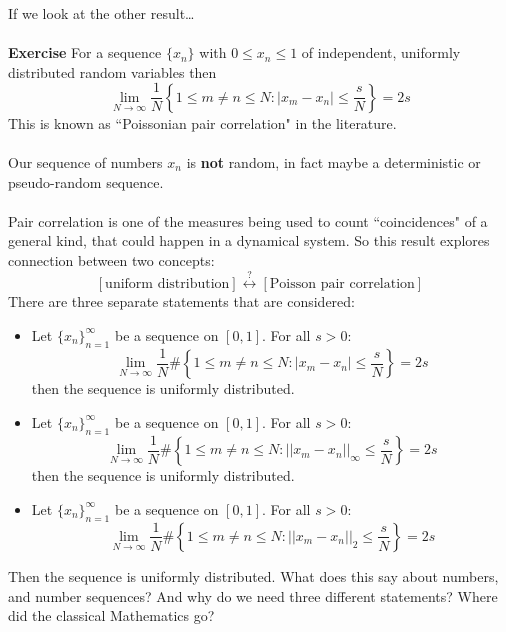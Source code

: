 \documentclass[12pt]{article}
\begin{document}
\newpage 

\noindent If we look at the other result\dots \\ \\
\textbf{Exercise} For a sequence $\{ x_n\}$ with $0 \leq x_n \leq 1$ of independent, uniformly distributed random variables then
$$\lim_{N \to \infty} \frac{1}{N} \left\{ 1 \leq m \neq n \leq N : |x_m - x_n| \leq \frac{s}{N} \right\} = 2s $$
This is known as ``Poissonian pair correlation" in the literature. \\ \\
Our sequence of numbers $x_n$ is \textbf{not} random, in fact maybe a deterministic or pseudo-random sequence. \\ \\
Pair correlation is one of the measures being used to count ``coincidences" of a general kind, that could happen in a dynamical system.   So this result explores connection between two concepts:
$$ [\text{uniform distribution}] \stackrel{?}{\longleftrightarrow} [\text{Poisson pair correlation}]$$
There are three separate statements that are considered:
\begin{itemize}
\item Let $\{ x_n\}_{n=1}^\infty$ be a sequence on $[0,1]$.  For all $s > 0$:
$$ \lim_{N \to \infty} \frac{1}{N} \# \left\{ 1 \leq m \neq n \leq N : |x_m - x_n| \leq \frac{s}{N} \right\} = 2s $$
then the sequence is uniformly distributed. 
\item Let $\{ x_n\}_{n=1}^\infty$ be a sequence on $[0,1]$.  For all $s > 0$:
$$ \lim_{N \to \infty} \frac{1}{N} \# \left\{ 1 \leq m \neq n \leq N : ||x_m - x_n||_\infty \leq \frac{s}{N} \right\} = 2s $$
then the sequence is uniformly distributed. 
\item Let $\{ x_n\}_{n=1}^\infty$ be a sequence on $[0,1]$.  For all $s > 0$:
$$ \lim_{N \to \infty} \frac{1}{N} \# \left\{ 1 \leq m \neq n \leq N : ||x_m - x_n||_2 \leq \frac{s}{N} \right\} = 2s $$
\end{itemize}
Then the sequence is uniformly distributed. What does this say about numbers, and number sequences?  And why do we need three different statements?  Where did the classical Mathematics go?
\vfill
\end{document}
